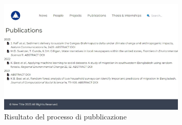\documentclass[target=bach,aauheader=]{thud}
\begin{document}
\begin{figure}
    \centering
    \includegraphics[width = 0.8\textwidth]{images/publications.png}
    \caption{Risultato del processo di pubblicazione}
    \label{img:pub}
\end{figure}

\end{document}
